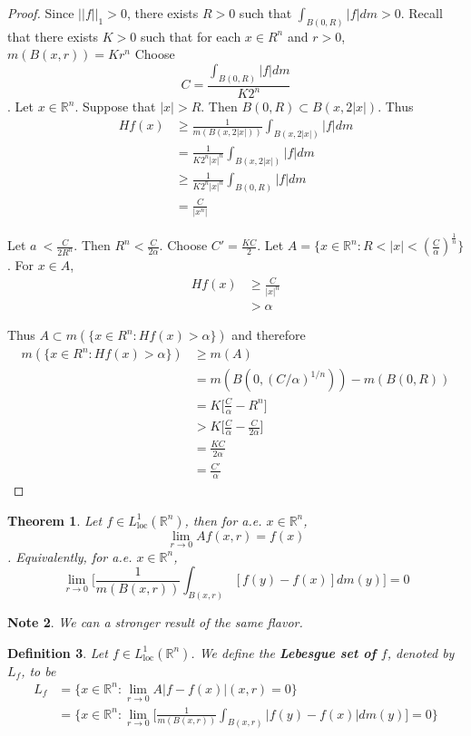 \documentclass[12pt]{amsart}
\newtheorem{thm}{Theorem}[subsection]
\newtheorem{defn}[thm]{Definition}
\newtheorem{note}[thm]{Note}
\newcommand{\al}{\alpha}
\newcommand{\R}{\mathbb{R}}
\newcommand{\Ll}{L^1_{\text{loc}}(\R^n)}
\begin{document}
	\begin{proof}
		Since $||f||_1 >0$, there exists $R>0$ such that $\int_{B(0,R)}|f|dm >0$. Recall that there exists $K>0$ such that for each $x \in R^n$ and $r>0$, $m(B(x,r)) = Kr^n$ Choose $$C = \frac{\int_{B(0,R)}|f|dm}{K2^n}$$. Let $x \in \R^n$. Suppose that $|x|>R$. Then $B(0,R) \subset B(x,2|x|)$. Thus 
		\begin{align*}
			Hf(x) 
			&\geq \frac{1}{m(B(x,2|x|))}\int_{B(x,2|x|)}|f|dm\\
			&= \frac{1}{K2^n|x|^n}\int_{B(x,2|x|)}|f|dm \\
			&\geq \frac{1}{K2^n|x|^n}\int_{B(0,R)}|f|dm \\
			&= \frac{C}{|x^n|}
		\end{align*}
		
		Let $a\ < \frac{C}{2R^n}$. Then $R^n < \frac{C}{2 \al}$. Choose $C' =\frac{KC}{2}$. Let $A = \{x \in \R^n: R < |x|< (\frac{C}{\al})^{\frac{1}{n}}\}$. For $x \in A$, 
		\begin{align*}
			Hf(x) 
			&\geq \frac{C}{|x|^n} \\
			& > \al
		\end{align*}
		
		Thus $A \subset m(\{x \in R^n: Hf(x)> \al\})$ and therefore 
		\begin{align*}
			m(\{x \in R^n: Hf(x)> \al\}) 
			&\geq m(A) \\
			&= m(B(0,(C/\al)^{1/n})) - m(B(0,R)) \\
			&= K\bigg [\frac{C}{\al} - R^n \bigg] \\
			&> K\bigg[\frac{C}{\al} - \frac{C}{2 \al}\bigg] \\
			&= \frac{KC}{2 \al}\\
			&= \frac{C'}{\al}
		\end{align*}
	\end{proof}
	
	\begin{thm}
		Let $f \in \Ll$, then for a.e. $x \in \R^n$, $$\lim_{r \rightarrow 0} Af(x,r) =f(x)$$. Equivalently, for a.e. $x \in \R^n$, $$ \lim_{r \rightarrow 0} \bigg[ \frac{1}{m(B(x,r))}\int_{B(x,r)}[f(y)-f(x)]dm(y)\bigg] =0$$
	\end{thm}
	
	\begin{note}
		We can a stronger result of the same flavor.
	\end{note}
	
	\begin{defn}
		Let $f \in \Ll$. We define the \textbf{Lebesgue set of $f$}, denoted by $L_f$, to be 
		\begin{align*}
			L_f 
			&= \{x \in \R^n: \lim_{r \rightarrow 0} A|f-f(x)|(x,r) =0 \}\\
			&= \bigg \{x \in \R^n: \lim_{r \rightarrow 0} \bigg[ \frac{1}{m(B(x,r))}\int_{B(x,r)}|f(y) - f(x)|dm(y)\bigg] =0 \bigg \}
		\end{align*}
	\end{defn}
	
\end{document}
